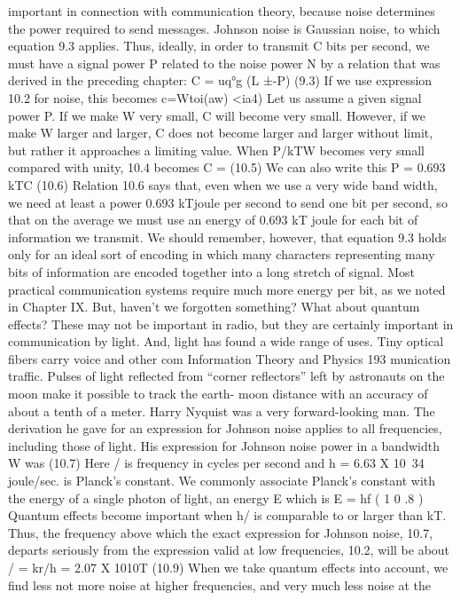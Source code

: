 {{{{{{{{{{{important in connection with communication theory, because
noise determines the power required to send messages. Johnson
noise is Gaussian noise, to which equation 9.3 applies. Thus,
ideally, in order to transmit C bits per second, we must have a
signal power P related to the noise power N by a relation that was
derived in the preceding chapter:
C = uq°g (L ±-P) (9.3)
If we use expression 10.2 for noise, this becomes
c=Wtoi(aw) <ia4)
Let us assume a given signal power P. If we make W very
small, C will become very small. However, if we make W larger
and larger, C does not become larger and larger without limit, but
rather it approaches a limiting value. When P/kTW becomes very
small compared with unity, 10.4 becomes
C = (10.5)
We can also write this
P = 0.693 kTC (10.6)
Relation 10.6 says that, even when we use a very wide band
width, we need at least a power 0.693 kTjoule per second to send
one bit per second, so that on the average we must use an energy
of 0.693 kT joule for each bit of information we transmit. We
should remember, however, that equation 9.3 holds only for an
ideal sort of encoding in which many characters representing many
bits of information are encoded together into a long stretch of
signal. Most practical communication systems require much more
energy per bit, as we noted in Chapter IX.
But, haven’t we forgotten something? What about quantum
effects? These may not be important in radio, but they are certainly
important in communication by light. And, light has found a wide
range of uses. Tiny optical fibers carry voice and other com
Information Theory and Physics 193
munication traffic. Pulses of light reflected from “corner reflectors”
left by astronauts on the moon make it possible to track the earth-
moon distance with an accuracy of about a tenth of a meter.
Harry Nyquist was a very forward-looking man. The derivation
he gave for an expression for Johnson noise applies to all frequencies,
including those of light. His expression for Johnson noise
power in a bandwidth W was
(10.7)
Here / is frequency in cycles per second and
h = 6.63 X 10~34 joule/sec.
is Planck’s constant. We commonly associate Planck’s constant
with the energy of a single photon of light, an energy E which is
E = hf ( 1 0 .8 )
Quantum effects become important when h/ is comparable to or
larger than kT. Thus, the frequency above which the exact expression
for Johnson noise, 10.7, departs seriously from the expression
valid at low frequencies, 10.2, will be about
/ = kr/h = 2.07 X 1010T (10.9)
When we take quantum effects into account, we find less not
more noise at higher frequencies, and very much less noise at the
}}}}}}}}}}}

